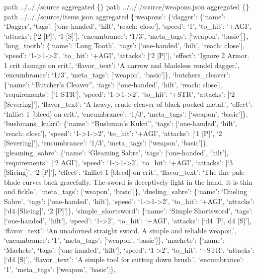 \documentclass[
  letterpaper,
  DIV=11,
  numbers=noendperiod]{scrartcl}
\begin{document}
path ../.././source aggregated \{\} path ../.././source/weapons.json
aggregated \{\} path ../.././source/items.json aggregated \{`weapons':
\{`dagger': \{`name': `Dagger', `tags': {[}`one-handed', `hilt', `reach:
close'{]}, `speed': `1', `to\_hit': `+AGI', `attacks': {[}`2 {[}P{]}',
`1 {[}S{]}'{]}, `encumbrance': `1/3', `meta\_tags': {[}`weapon',
`basic'{]}\}, `long\_tooth': \{`name': `Long Tooth', `tags':
{[}`one-handed', `hilt', `reach: close'{]}, `speed':
`1-\textgreater1-\textgreater2', `to\_hit': `+AGI', `attacks': {[}`2
{[}P{]}'{]}, `effect': `Ignore 2 Armor. 1 crit damage on crit.',
`flavor\_text': `A narrow and bladeless rondel dagger.', `encumbrance':
`1/3', `meta\_tags': {[}`weapon', `basic'{]}\}, `butchers\_cleaver':
\{`name': ``Butcher's Cleaver'', `tags': {[}`one-handed', `hilt',
`reach: close'{]}, `requirements': {[}`1 STR'{]}, `speed':
`1-\textgreater1-\textgreater2', `to\_hit': `+STR', `attacks': {[}`2
{[}Severing{]}'{]}, `flavor\_text': `A heavy, crude cleaver of black
pocked metal.', `effect': `Inflict 1 {[}bleed{]} on crit.',
`encumbrance': `1/3', `meta\_tags': {[}`weapon', `basic'{]}\},
`bushmans\_kukri': \{`name': ``Bushman's Kukri'', `tags':
{[}`one-handed', `hilt', `reach: close'{]}, `speed':
`1-\textgreater1-\textgreater2', `to\_hit': `+AGI', `attacks': {[}`1
{[}P{]}', `2 {[}Severing{]}'{]}, `encumbrance': `1/3', `meta\_tags':
{[}`weapon', `basic'{]}\}, `gleaming\_sabre': \{`name': `Gleaming
Sabre', `tags': {[}`one-handed', `hilt'{]}, `requirements': {[}`2
AGI'{]}, `speed': `1-\textgreater1-\textgreater2', `to\_hit': `+AGI',
`attacks': {[}`3 {[}Slicing{]}', `2 {[}P{]}'{]}, `effect': `Inflict 1
{[}bleed{]} on crit.', `flavor\_text': `The fine pale blade curves back
gracefully. The sword is deceptively light in the hand, it is thin and
fickle.', `meta\_tags': {[}`weapon', `basic'{]}\}, `dueling\_sabre':
\{`name': `Dueling Sabre', `tags': {[}`one-handed', `hilt'{]}, `speed':
`1-\textgreater1-\textgreater2', `to\_hit': `+AGI', `attacks': {[}`d4
{[}Slicing{]}', `2 {[}P{]}'{]}\}, `simple\_shortsword': \{`name':
`Simple Shortsword', `tags': {[}`one-handed', `hilt'{]}, `speed':
`1-\textgreater2', `to\_hit': `+AGI', `attacks': {[}`d4 {[}P{]}, d4
{[}S{]}'{]}, `flavor\_text': `An unadorned straight sword. A simple and
reliable weapon.', `encumbrance': `1', `meta\_tags': {[}`weapon',
`basic'{]}\}, `machete': \{`name': `Machete', `tags': {[}`one-handed',
`hilt'{]}, `speed': `1-\textgreater2', `to\_hit': `+STR', `attacks':
{[}`d4 {[}S{]}'{]}, `flavor\_text': `A simple tool for cutting down
brush.', `encumbrance': `1', `meta\_tags': {[}`weapon', `basic'{]}\},
\end{document}
